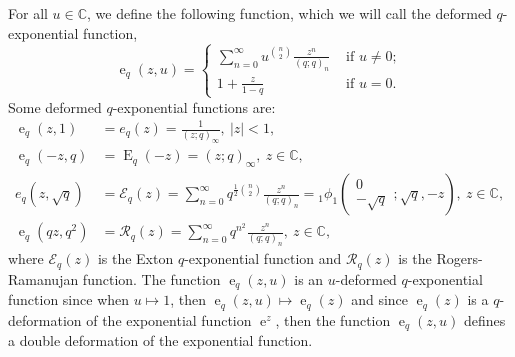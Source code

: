 \documentclass{cimart}
\newcommand{\C}{\mathbb{C}}
\DeclareMathOperator{\ope}{e}
\DeclareMathOperator{\opE}{E}
\begin{document}
For all $u\in\C$, we define the following function, which we will call the deformed $q$-exponential function,
\begin{equation*}
    \ope_{q}(z,u)=
    \begin{cases}
        \sum_{n=0}^{\infty}u^{\binom{n}{2}}\frac{z^{n}}{(q;q)_{n}}&\text{ if }u\neq0;\\
        1+\frac{z}{1-q}&\text{ if }u=0.
    \end{cases}
\end{equation*}
Some deformed $q$-exponential functions are:
\begin{align*}
    \ope_{q}(z,1)&=e_{q}(z)=\frac{1}{(z;q)_{\infty}},\ \vert z\vert<1,\\
    \ope_{q}(-z,q)&=\opE_{q}(-z)=(z;q)_{\infty},\ z\in\C,\\
    e_{q}(z,\sqrt{q})&=\mathcal{E}_{q}(z)=\sum_{n=0}^{\infty}q^{\frac{1}{2}\binom{n}{2}}\frac{z^n}{(q;q)_{n}}={}_{1}\phi_{1}\left(\begin{array}{c}
         0\\
         -\sqrt{q}
    \end{array};\sqrt{q},-z\right),\ z\in\C,\\
    \ope_{q}(qz,q^2)&=\mathcal{R}_{q}(z)=\sum_{n=0}^{\infty}q^{n^2}\frac{z^n}{(q;q)_{n}},\ z\in\C,
\end{align*}
where $\mathcal{E}_{q}(z)$ is the Exton $q$-exponential function and  $\mathcal{R}_{q}(z)$ is the Rogers-Ramanujan function. The function $\ope_{q}(z,u)$ is an $u$-deformed $q$-exponential function since when $u\mapsto1$, then $\ope_{q}(z,u)\mapsto\ope_{q}(z)$ and since $\ope_{q}(z)$ is a $q$-deformation of the exponential function $\ope^z$, then the function $\ope_{q}(z,u)$ defines a double deformation of the exponential function.
\end{document}
